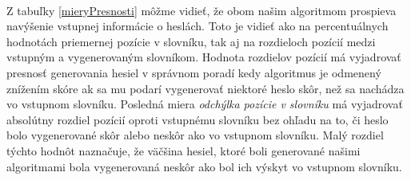 \paragraph{}
Z tabuľky \ref{mieryPresnosti} môžme vidieť, že obom našim algoritmom prospieva navýšenie vstupnej informácie o heslách. Toto je vidieť ako na percentuálnych hodnotách priemernej pozície v slovníku, tak aj na rozdieloch pozícií medzi vstupným a vygenerovaným slovníkom. Hodnota rozdielov pozícií má vyjadrovať presnosť generovania hesiel v správnom poradí kedy algoritmus je odmenený znížením skóre ak sa mu podarí vygenerovať niektoré heslo skôr, než sa nachádza vo vstupnom slovníku. Posledná miera \emph{odchýlka pozície v slovníku} má vyjadrovať absolútny rozdiel pozícií oproti vstupnému slovníku bez ohľadu na to, či heslo bolo vygenerované skôr alebo neskôr ako vo vstupnom slovníku. Malý rozdiel týchto hodnôt naznačuje, že väčšina hesiel, ktoré boli generované našimi algoritmami bola vygenerovaná neskôr ako bol ich výskyt vo vstupnom slovníku.